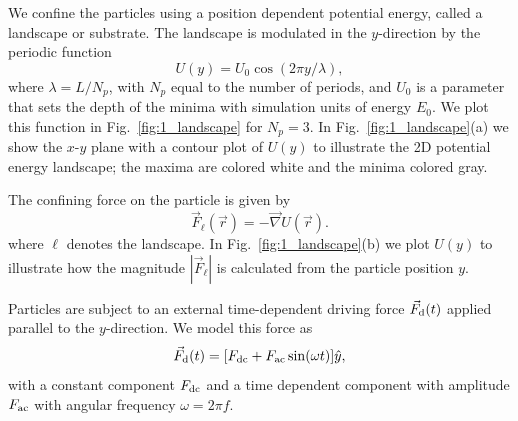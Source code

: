 \documentclass[preprint,showpacs,preprintnumbers,amsmath,amssymb,aps,prb]{revtex4-1}
\theoremstyle{remark}
\begin{document}
We confine the particles using a position dependent 
potential energy, called a landscape or substrate.
The landscape is modulated in the $y$-direction
by the periodic function 
 \begin{equation}
   U(y) = U_0 \cos{(2 \pi y / \lambda)},
     \label{eq:ysubstrate}
\end{equation}
where $\lambda=L/N_p$, with $N_p$ equal to the number of periods,
and $U_0$ is a parameter
 that sets the depth of the minima
 with simulation units of energy $E_0$. 
 We plot this function in 
 Fig.~\ref{fig:1_landscape}
 for $N_p = 3$.  In Fig.~\ref{fig:1_landscape}(a) we show 
 the $x$-$y$ plane with a contour plot of $U(y)$ 
 to illustrate
 the 2D potential energy landscape;
 the maxima are colored white and the minima colored gray.

The confining force on the particle %
 is given by
 \begin{equation}
 \vec{F}_{\ell}(\vec{r}) = - \vec \nabla U(\vec{r}). %
 \label{eq:dudr}
 \end{equation}
 where $\ell$ denotes the landscape.
 In Fig.~\ref{fig:1_landscape}(b) we plot  
 $U(y)$ to illustrate how the magnitude
 $|\vec{F}_{\ell}|$ is calculated from the particle position $y$.
 
Particles are subject to an external time-dependent driving force
$\vec{F}_{\rm d}(t)$
applied parallel to the $y$-direction.
We model this force as
\begin{equation}
  \vec{F}_{\rm d}(t) = [F_{\rm dc} + F_{\rm ac} \sin(\omega t)] \hat{y},
    \label{eq:drive}
\end{equation}
with 
a constant component $F_{\rm dc}$
and a time dependent component with amplitude $F_{\rm ac}$
with angular frequency $\omega = 2 \pi f$.
\end{document}
